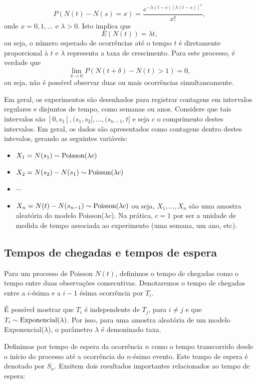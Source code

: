 \documentclass[
  letterpaper,
  DIV=11,
  numbers=noendperiod]{scrreprt}
\providecommand{\tightlist}{%
  \setlength{\itemsep}{0pt}\setlength{\parskip}{0pt}}\usepackage{longtable,booktabs,array}
\theoremstyle{definition}
\theoremstyle{definition}
\theoremstyle{plain}
\theoremstyle{remark}
\begin{document}
\[P(N(t)-N(s)=x)=\frac{e^{-\lambda(t-s)[\lambda(t-s)]^x}}{x!},\] onde
\(x=0,1,\ldots\) e \(\lambda>0\). Isto implica que
\[E(N(t))=\lambda t,\] ou seja, o número esperado de ocorrências até o
tempo \(t\) é diretamente proporcional à \(t\) e \(\lambda\) representa
a taxa de crescimento. Para este processo, é verdade que
\[\lim_{\delta\rightarrow 0}P(N(t+\delta)-N(t)>1)=0,\] ou seja, não é
possível observar duas ou mais ocorrências simultaneamente.

Em geral, os experimentos são desenhados para registrar contagens em
intervalos regulares e disjuntos de tempo, como semanas ou anos.
Considere que tais intervalos são
\([0,s_1],(s_1,s_2],\ldots,(s_{n-1},t]\) e seja \(c\) o comprimento
destes intervalos. Em geral, os dados são apresentados como contagens
dentro destes intevalos, gerando as seguintes variáveis:

\begin{itemize}
\tightlist
\item
  \(X_1=N(s_1)\sim\hbox{Poisson}(\lambda c)\)
\item
  \(X_2=N(s_2)-N(s_1)\sim\hbox{Poisson}(\lambda c)\)
\item
  \(\cdots\)
\item
  \(X_n=N(t)-N(s_{n-1})\sim\hbox{Poisson}(\lambda c)\) ou seja,
  \(X_1,\ldots,X_n\) são uma amostra aleatória do modelo
  Poisson(\(\lambda c\)). Na prática, \(c=1\) por ser a unidade de
  medida de tempo associada ao experimento (uma semana, um ano, etc).
\end{itemize}

\subsection{Tempos de chegadas e tempos de
espera}\label{tempos-de-chegadas-e-tempos-de-espera}

Para um processo de Poisson \(N(t)\), definimos o tempo de chegadas como
o tempo entre duas observações consecutivas. Denotaremos o tempo de
chegadas entre a \(i\)-ésima e a \(i-1\) ésima ocorrência por \(T_i\).

É possível mostrar que \(T_i\) é independente de \(T_j\), para
\(i\neq j\) e que \(T_i\sim\hbox{Exponencial}(\lambda)\). Por isso, para
uma amostra aleatória de um modelo Exponencial(\(\lambda\)), o parâmetro
\(\lambda\) é demoninado taxa.

Definimos por tempo de espera da ocorrência \(n\) como o tempo
transcorrido desde o início do processo até a ocorrência do \(n\)-ésimo
evento. Este tempo de espera é denotado por \(S_n\). Exsitem dois
resultados importantes relacionados ao tempo de espera:
\end{document}
